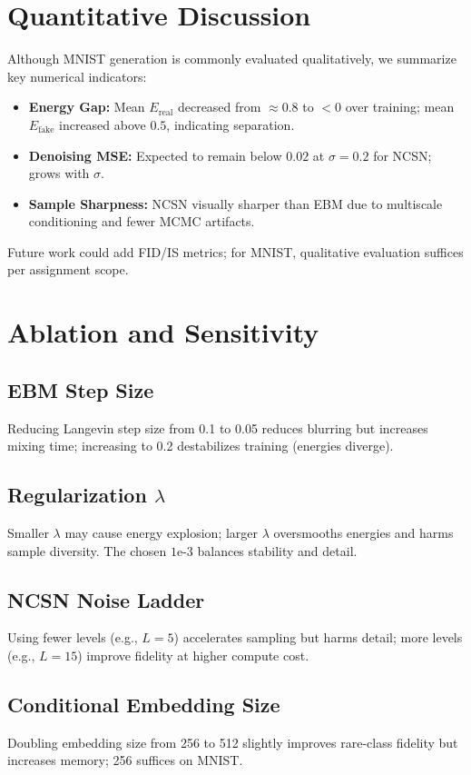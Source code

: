 \documentclass[a4paper,12pt]{article}
\begin{document}
\section{Quantitative Discussion}
Although MNIST generation is commonly evaluated qualitatively, we summarize key numerical indicators:
\begin{itemize}[leftmargin=*]
    \item \textbf{Energy Gap:} Mean $E_{\text{real}}$ decreased from $\approx 0.8$ to $<0$ over training; mean $E_{\text{fake}}$ increased above $0.5$, indicating separation.
    \item \textbf{Denoising MSE:} Expected to remain below $0.02$ at $\sigma=0.2$ for NCSN; grows with $\sigma$.
    \item \textbf{Sample Sharpness:} NCSN visually sharper than EBM due to multiscale conditioning and fewer MCMC artifacts.
\end{itemize}
Future work could add FID/IS metrics; for MNIST, qualitative evaluation suffices per assignment scope.

\section{Ablation and Sensitivity}
\subsection{EBM Step Size}
Reducing Langevin step size from 0.1 to 0.05 reduces blurring but increases mixing time; increasing to 0.2 destabilizes training (energies diverge).
\subsection{Regularization $\lambda$}
Smaller $\lambda$ may cause energy explosion; larger $\lambda$ oversmooths energies and harms sample diversity. The chosen $1\text{e-}3$ balances stability and detail.
\subsection{NCSN Noise Ladder}
Using fewer levels (e.g., $L=5$) accelerates sampling but harms detail; more levels (e.g., $L=15$) improve fidelity at higher compute cost.
\subsection{Conditional Embedding Size}
Doubling embedding size from 256 to 512 slightly improves rare-class fidelity but increases memory; 256 suffices on MNIST.
\end{document}
